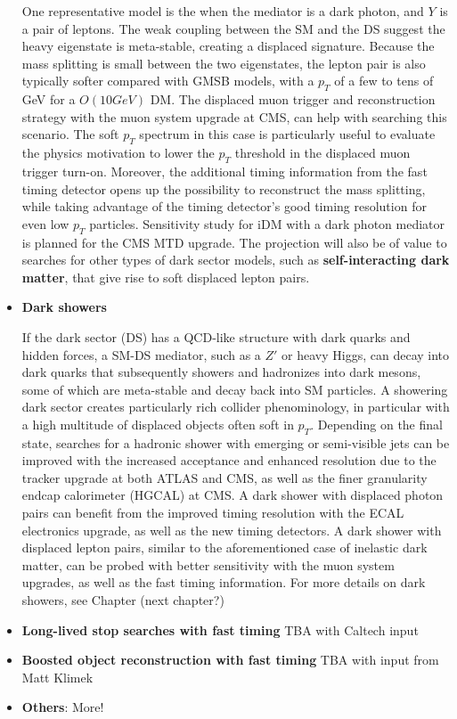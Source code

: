 \begin{itemize}
One representative model is the when the mediator is a dark photon, and $Y$ is a pair of leptons. 
The weak coupling between the SM and the DS suggest the heavy eigenstate is meta-stable, creating a displaced signature.
Because the mass splitting is small between the two eigenstates, the lepton pair is also typically softer compared with GMSB models, with a $p_T$ of a few to tens of GeV for a $O(10GeV)$ DM. 
The displaced muon trigger and reconstruction strategy with the muon system upgrade at CMS, can help with searching this scenario. 
The soft $p_T$ spectrum in this case is particularly useful to evaluate the physics motivation to lower the $p_T$ threshold in the displaced muon trigger turn-on.
Moreover, the additional timing information from the fast timing detector opens up the possibility to reconstruct the mass splitting, while taking advantage of the timing detector's good timing resolution for even low $p_T$ particles. 
Sensitivity study for iDM with a dark photon mediator is planned for the CMS MTD upgrade. The projection will also be of value to searches for other types of dark sector models, such as \textbf{self-interacting dark matter}, that give rise to soft displaced lepton pairs.

\item \textbf{Dark showers}

If the dark sector (DS) has a QCD-like structure with dark quarks and hidden forces, a SM-DS mediator, such as a $Z'$ or heavy Higgs, can decay into dark quarks that subsequently showers and hadronizes into dark mesons, some of which are meta-stable and decay back into SM particles. 
A showering dark sector creates particularly rich collider phenominology, in particular with a high multitude of displaced objects often soft in $p_T$. 
Depending on the final state, searches for a hadronic shower with emerging or semi-visible jets can be improved with the increased acceptance and enhanced resolution due to the tracker upgrade at both ATLAS and CMS, as well as the finer granularity endcap calorimeter (HGCAL) at CMS. 
A dark shower with displaced photon pairs can benefit from the improved timing resolution with the ECAL electronics upgrade, as well as the new timing detectors. 
A dark shower with displaced lepton pairs, similar to the aforementioned case of inelastic dark matter, can be probed with better sensitivity with the muon system upgrades, as well as the fast timing information. 
For more details on dark showers, see Chapter (next chapter?) 

\item \textbf{Long-lived stop searches with fast timing} 
TBA with Caltech input 

\item \textbf{Boosted object reconstruction with fast timing}
TBA with input from Matt Klimek

\item \textbf{Others}: More!
\end{itemize}

